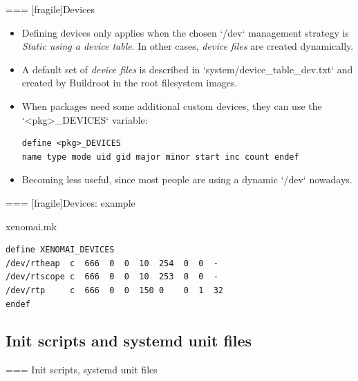 === [fragile]{Devices}
  \begin{itemize}
  \item Defining devices only applies when the chosen `/dev`
    management strategy is {\em Static using a device table}. In other
    cases, {\em device files} are created dynamically.
  \item A default set of {\em device files} is described in
    `system/device_table_dev.txt` and created by Buildroot in the
    root filesystem images.
  \item When packages need some additional custom devices, they can
    use the `<pkg>_DEVICES` variable:
{\small
  \begin{block}{}
\begin{verbatim}
define <pkg>_DEVICES
name type mode uid gid major minor start inc count endef
\end{verbatim}
  \end{block}}
\item Becoming less useful, since most people are using a dynamic
  `/dev` nowadays.
  \end{itemize}


=== [fragile]{Devices: example}

    \begin{block}{xenomai.mk}
      \begin{verbatim}
define XENOMAI_DEVICES
/dev/rtheap  c  666  0  0  10  254  0  0  -
/dev/rtscope c  666  0  0  10  253  0  0  -
/dev/rtp     c  666  0  0  150 0    0  1  32
endef
      \end{verbatim}
    \end{block}



\subsection{Init scripts and systemd unit files}

=== {Init scripts, systemd unit files}

